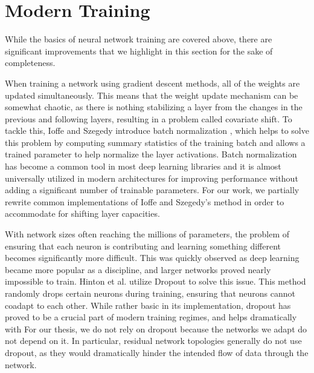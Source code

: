 \section{Modern Training}
While the basics of neural network training are covered above, there are significant improvements that we highlight in this section for the sake of completeness. 

When training a network using gradient descent methods, all of the weights are updated simultaneously.
This means that the weight update mechanism can be somewhat chaotic, as there is nothing stabilizing a layer from the changes in the previous and following layers, resulting in a problem called covariate shift.
To tackle this, Ioffe and Szegedy introduce batch normalization \cite{ioffe2015batch}, which helps to solve this problem by computing summary statistics of the training batch and allows a trained parameter to help normalize the layer activations.
Batch normalization has become a common tool in most deep learning libraries and it is almost universally utilized in modern architectures for improving performance without adding a significant number of trainable parameters.
For our work, we partially rewrite common implementations of Ioffe and Szegedy's method in order to accommodate for shifting layer capacities.

With network sizes often reaching the millions of parameters, the problem of ensuring that each neuron is contributing and learning something different becomes significantly more difficult.
This was quickly observed as deep learning became more popular as a discipline, and larger networks proved nearly impossible to train.
Hinton et al. utilize Dropout \cite{hinton2012improving, srivastava2014dropout} to solve this issue.
This method randomly drops certain neurons during training, ensuring that neurons cannot coadapt to each other.
While rather basic in its implementation, dropout has proved to be a crucial part of modern training regimes, and helps dramatically with 
For our thesis, we do not rely on dropout because the networks we adapt do not depend on it.
In particular, residual network topologies generally do not use dropout, as they would dramatically hinder the intended flow of data through the network.

